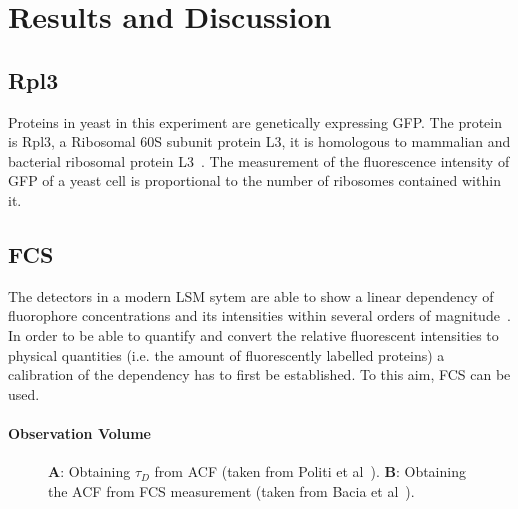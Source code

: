 \section{Results and Discussion}

\subsection{Rpl3}
Proteins in yeast in this experiment are genetically expressing GFP. 
The protein is Rpl3, a Ribosomal 60S subunit protein L3, it is homologous to mammalian and bacterial ribosomal protein L3~\cite{YeaGenRpl3}. 
The measurement of the fluorescence intensity of GFP of a yeast cell is proportional to the number of ribosomes contained within it.

\subsection{FCS}
The detectors in a modern LSM sytem are able to show a linear dependency of fluorophore concentrations and its intensities within several orders of magnitude~\cite{Politi2018}. 
In order to be able to quantify and convert the relative fluorescent intensities to physical quantities (i.e. the amount of fluorescently labelled proteins) a calibration of the dependency has to first be established. 
To this aim, FCS can be used.

\paragraph{Observation Volume} 
\begin{figure}[h!]
\centering
{}\hfil
{}
\caption{\textbf{A}: Obtaining $\tau_{D}$ from ACF (taken from Politi et al~\cite{Politi2018}). \textbf{B}: Obtaining the ACF from FCS measurement (taken from Bacia et al~\cite{Bacia2006}).}
\label{fig:acf-fcs}
\end{figure}

